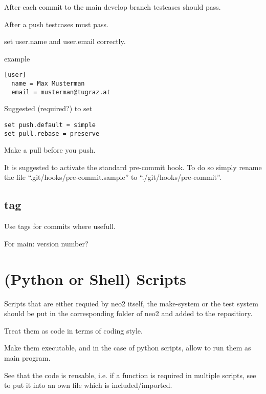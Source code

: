 \documentclass{article}
\begin{document}
After each commit to the main develop branch testcases should pass.

After a push testcases must pass.

set user.name and user.email correctly.

example
\begin{verbatim}
[user]
  name = Max Musterman
  email = musterman@tugraz.at
\end{verbatim}

Suggested (required?) to set
\begin{verbatim}
set push.default = simple
set pull.rebase = preserve
\end{verbatim}

Make a pull before you push.

It is suggested to activate the standard pre-commit hook. To do so
simply rename the file ``.git/hooks/pre-commit.sample'' to
``./git/hooks/pre-commit''.

\subsection{tag}

Use tags for commits where usefull.

For main: version number?

\section{(Python or Shell) Scripts}
Scripts that are either requied by neo2 itself, the make-system or the
test system should be put in the corresponding folder of neo2 and added
to the repositiory.

Treat them as code in terms of coding style.

Make them executable, and in the case of python scripts, allow to run
them as main program.

See that the code is reusable, i.e. if a function is required in
multiple scripts, see to put it into an own file which is
included/imported.
\end{document}
